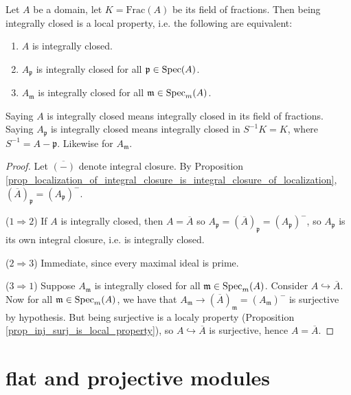 \documentclass[12pt]{article}
\begin{document}
\begin{proposition}
	Let $A$ be a domain, let $K=\text{Frac}(A)$ be its field of fractions. Then being integrally closed is a local property, i.e. the following are equivalent:
	\begin{enumerate}
		\item $A$ is integrally closed.
		\item $A_\mathfrak{p}$ is integrally closed for all $\mathfrak{p}\in\text{Spec}(A)$.
		\item $A_\mathfrak{m}$ is integrally closed for all $\mathfrak{m}\in\text{Spec}_m(A)$.
	\end{enumerate}
\end{proposition}

\begin{remark}
	Saying $A$ is integrally closed means integrally closed in its field of fractions. Saying $A_\mathfrak{p}$ is integrally closed means integrally closed in $S^{-1}K=K$, where $S^{-1}=A-\mathfrak{p}$. Likewise for $A_\mathfrak{m}$.
\end{remark}

\begin{proof}
	Let $\overline{(-)}$ denote integral closure. By Proposition \ref{prop_localization_of_integral_closure_is_integral_closure_of_localization}, $(\overline{A})_\mathfrak{p}=(A_\mathfrak{p})^-$.

	($1\Rightarrow 2$) If $A$ is integrally closed, then $A=\overline{A}$ so $A_\mathfrak{p}=(\overline{A})_\mathfrak{p}=(A_\mathfrak{p})^-$, so $A_\mathfrak{p}$ is its own integral closure, i.e. is integrally closed.

	($2\Rightarrow 3$) Immediate, since every maximal ideal is prime.

	($3\Rightarrow 1$) Suppose $A_\mathfrak{m}$ is integrally closed for all $\mathfrak{m}\in\text{Spec}_m(A)$. Consider $A\hookrightarrow\overline{A}$. Now for all $\mathfrak{m}\in\text{Spec}_m(A)$, we have that $A_\mathfrak{m}\to (\overline{A})_\mathfrak{m}=(A_\mathfrak{m})^-$ is surjective by hypothesis. But being surjective is a localy property (Proposition \ref{prop_inj_surj_is_local_property}), so $A\hookrightarrow\overline{A}$ is surjective, hence $A=\overline{A}$.
\end{proof}


\section{flat and projective modules} %
\end{document}
